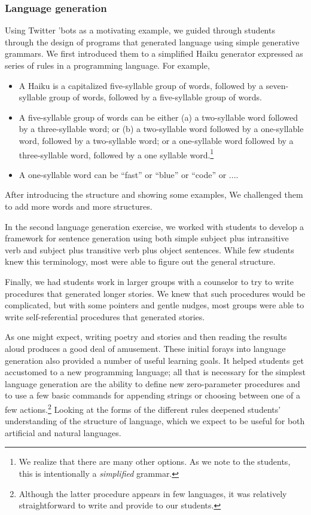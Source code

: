 \subsubsection{Language generation}

Using Twitter 'bots as a motivating example, we guided through
students through the design of programs that generated language
using simple generative grammars.  We first introduced them to a
simplified Haiku generator expressed as series of rules in a
programming language.  For example,

\begin{itemize}
\item A Haiku is a capitalized five-syllable group of words, followed
  by a seven-syllable group of words, followed by a five-syllable
  group of words.
\item A five-syllable group of words can be either (a) a two-syllable
  word followed by a three-syllable word; or (b) a two-syllable word
  followed by a one-syllable word, followed by a two-syllable word;
  or a one-syllable word followed by a three-syllable word, followed
  by a one syllable word.\footnote{We realize that there are many
  other options.  As we note to the students, this is intentionally
  a \textit{simplified} grammar.}
\item A one-syllable word can be ``fast'' or ``blue'' or ``code'' or ....
\end{itemize}

After introducing the structure and showing some examples, We
challenged them to add more words and more structures.

In the second language generation exercise, we worked with students
to develop a framework for sentence generation using both simple
subject plus intransitive verb and subject plus transitive verb
plus object sentences.  While few students knew this terminology,
most were able to figure out the general structure.

Finally, we had students work in larger groups with a counselor to
try to write procedures that generated longer stories.    We knew
that such procedures would be complicated, but with some pointers
and gentle nudges, most groups were able to write self-referential
procedures that generated stories.

As one might expect, writing poetry and stories and then reading
the results aloud produces a good deal of amusement.  These initial
forays into language generation also provided a number of useful
learning goals.  It helped students get accustomed to a new programming
language; all that is necessary for the simplest language generation
are the ability to define new zero-parameter procedures and to use
a few basic commands for appending strings or choosing between one
of a few actions.\footnote{Although the latter procedure appears
in few languages, it was relatively straightforward to write and
provide to our students.}   Looking at the forms of the different
rules deepened students' understanding of the structure of language, which
we expect to be useful for both artificial and natural languages.


